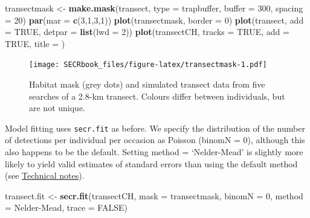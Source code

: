 \documentclass[
]{book}
\newenvironment{Shaded}{\begin{snugshade}}{\end{snugshade}}
\newcommand{\AttributeTok}[1]{\textcolor[rgb]{0.13,0.29,0.53}{#1}}
\newcommand{\ConstantTok}[1]{\textcolor[rgb]{0.56,0.35,0.01}{#1}}
\newcommand{\DecValTok}[1]{\textcolor[rgb]{0.00,0.00,0.81}{#1}}
\newcommand{\FunctionTok}[1]{\textcolor[rgb]{0.13,0.29,0.53}{\textbf{#1}}}
\newcommand{\NormalTok}[1]{#1}
\newcommand{\OtherTok}[1]{\textcolor[rgb]{0.56,0.35,0.01}{#1}}
\newcommand{\StringTok}[1]{\textcolor[rgb]{0.31,0.60,0.02}{#1}}
\begin{document}
\begin{Shaded}
\begin{Highlighting}[]
\NormalTok{transectmask }\OtherTok{\textless{}{-}} \FunctionTok{make.mask}\NormalTok{(transect, }\AttributeTok{type =} \StringTok{\textquotesingle{}trapbuffer\textquotesingle{}}\NormalTok{, }\AttributeTok{buffer =} \DecValTok{300}\NormalTok{, }\AttributeTok{spacing =} \DecValTok{20}\NormalTok{)}
\FunctionTok{par}\NormalTok{(}\AttributeTok{mar =} \FunctionTok{c}\NormalTok{(}\DecValTok{3}\NormalTok{,}\DecValTok{1}\NormalTok{,}\DecValTok{3}\NormalTok{,}\DecValTok{1}\NormalTok{))}
\FunctionTok{plot}\NormalTok{(transectmask, }\AttributeTok{border =} \DecValTok{0}\NormalTok{)}
\FunctionTok{plot}\NormalTok{(transect, }\AttributeTok{add =} \ConstantTok{TRUE}\NormalTok{, }\AttributeTok{detpar =} \FunctionTok{list}\NormalTok{(}\AttributeTok{lwd =} \DecValTok{2}\NormalTok{))}
\FunctionTok{plot}\NormalTok{(transectCH, }\AttributeTok{tracks =} \ConstantTok{TRUE}\NormalTok{, }\AttributeTok{add =} \ConstantTok{TRUE}\NormalTok{, }\AttributeTok{title =} \StringTok{\textquotesingle{}\textquotesingle{}}\NormalTok{)}
\end{Highlighting}
\end{Shaded}

\begin{figure}
\centering
\texttt{[image: SECRbook\_files/figure-latex/transectmask-1.pdf]}
\caption{\label{fig:transectmask}Habitat mask (grey dots) and simulated transect data from five searches of a 2.8-km transect. Colours differ between individuals, but are not unique.}
\end{figure}

Model fitting uses \texttt{secr.fit} as before. We specify the distribution of the number of detections per individual per occasion as Poisson (binomN = 0), although this also happens to be the default. Setting method = `Nelder-Mead' is slightly more likely to yield valid estimates of standard errors than using the default method (see \hyperref[technotes]{Technical notes}).

\begin{Shaded}
\begin{Highlighting}[]
\NormalTok{transect.fit }\OtherTok{\textless{}{-}} \FunctionTok{secr.fit}\NormalTok{(transectCH, }\AttributeTok{mask =}\NormalTok{ transectmask, }
    \AttributeTok{binomN =} \DecValTok{0}\NormalTok{, }\AttributeTok{method =} \StringTok{\textquotesingle{}Nelder{-}Mead\textquotesingle{}}\NormalTok{, }\AttributeTok{trace =} \ConstantTok{FALSE}\NormalTok{)}
\end{Highlighting}
\end{Shaded}
\end{document}
